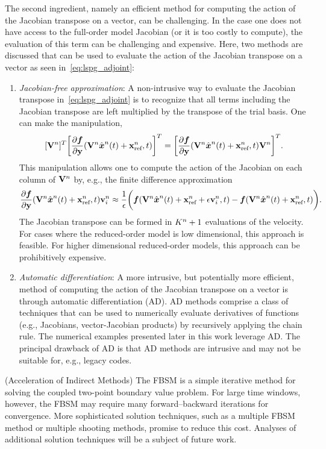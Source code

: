 The second ingredient, namely an efficient method for computing the action of the Jacobian transpose on a vector, can be challenging. 
In the case one does not have access to the full-order model Jacobian (or it is too costly to compute), the evaluation of this term can be challenging and expensive. Here, two methods are discussed that can be used to evaluate the action of the Jacobian transpose on a vector as seen in~\eqref{eq:lspg_adjoint}:
\begin{enumerate}
\item \textit{Jacobian-free approximation}: A non-intrusive way to evaluate the Jacobian transpose in~\eqref{eq:lspg_adjoint} is to recognize that all terms including the Jacobian transpose are left multiplied by the transpose of the trial basis. One can make the manipulation,
$$[\mathbf {V}^{n}]^T \bigg[\frac{\partial \boldsymbol f}{\partial \mathbf{y}} (\mathbf {V}^{n} \hat{ \boldsymbol x}^{n}(t) + \mathbf{x}_\text{ref}^{n},t)\bigg]^T = \bigg[  \frac{\partial \boldsymbol f}{\partial \mathbf{y}} (\mathbf {V}^{n} \hat{ \boldsymbol x}^{n}(t) + \mathbf{x}_\text{ref}^{n},t) \mathbf {V}^{n} \bigg]^T.$$
This manipulation allows one to compute the action of the Jacobian on each column of $\mathbf {V}^{n}$ by, e.g., the finite difference approximation
$$\frac{\partial \boldsymbol f}{\partial \mathbf{y}}(\mathbf {V}^{n} \hat{ \boldsymbol x}^{n}(t) + \mathbf{x}_\text{ref}^{n},t) \mathbf{v}_i^n \approx \frac{1}{\epsilon}\bigg( \boldsymbol f(\mathbf {V}^{n}\hat{ \boldsymbol x}^{n}(t) + \mathbf{x}_\text{ref}^{n} + \epsilon \mathbf{v}_i^n,t) - \boldsymbol f(\mathbf {V}^{n} \hat{ \boldsymbol x}^{n}(t) + \mathbf{x}_\text{ref}^{n},t) \bigg).$$
The Jacobian transpose can be formed in $K^{n}+1$ evaluations of the velocity. For cases where the reduced-order model is low dimensional, this approach is feasible. For higher dimensional reduced-order models, this approach can be prohibitively expensive.

\item \textit{Automatic differentiation}: A more intrusive, but potentially
	more efficient, method of computing the action of the Jacobian transpose on
		a vector is through automatic differentiation (AD). AD methods comprise a
		class of techniques that can be used to numerically evaluate derivatives
		of functions (e.g., Jacobians, vector-Jacobian products) by recursively
		applying the chain rule. The numerical examples presented later in this
		work leverage AD. The principal drawback of AD is that AD methods are intrusive and may not be suitable for, e.g., legacy codes.  
\end{enumerate}

\begin{remark}\label{remark:fbsm}(Acceleration of Indirect Methods)
The FBSM is a simple iterative method for solving the coupled two-point boundary value problem. For large time windows, however, the FBSM may require many 
forward--backward iterations for convergence. More sophisticated solution techniques, such as a multiple FBSM method or multiple shooting methods, promise 
to reduce this cost. Analyses of additional solution techniques will be a subject of future work.
\end{remark}

